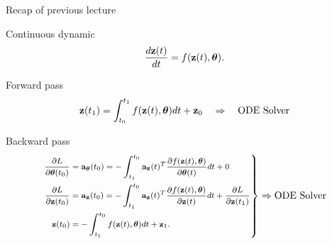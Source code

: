 

\usepackage{tikz}

\usetikzlibrary{arrows,shapes,positioning,shadows,trees}

\begin{frame}
\titlepage
\end{frame}
\begin{frame}{Recap of previous lecture}
	\begin{block}{Continuous dynamic}
		\vspace{-0.5cm}
		\[
			\frac{d\mathbf{z}(t)}{dt} = f(\mathbf{z}(t), \boldsymbol{\theta}).
		\]
		\vspace{-0.5cm}
	\end{block}
	\begin{block}{Forward pass}
		\vspace{-0.5cm}
		\[
			\mathbf{z}(t_1) = \int^{t_1}_{t_0} f(\mathbf{z}(t), \boldsymbol{\theta}) d t  + \mathbf{z}_0 \quad \Rightarrow \quad \text{ODE Solver}
		\]
		\vspace{-0.6cm}
	\end{block}
	\begin{block}{Backward pass}
		\vspace{-0.6cm}
		\begin{equation*}
			\left.
				{\footnotesize 
				\begin{aligned}
					\frac{\partial L}{\partial \boldsymbol{\theta}(t_0)} &= \mathbf{a}_{\boldsymbol{\theta}}(t_0) =  - \int_{t_1}^{t_0} \mathbf{a}_{\mathbf{z}}(t)^T \frac{\partial f(\mathbf{z}(t), \boldsymbol{\theta})}{\partial \boldsymbol{\theta}(t)} dt + 0 \\
					\frac{\partial L}{\partial \mathbf{z}(t_0)} &= \mathbf{a}_{\mathbf{z}}(t_0) =  - \int_{t_1}^{t_0} \mathbf{a}_{\mathbf{z}}(t)^T \frac{\partial f(\mathbf{z}(t), \boldsymbol{\theta})}{\partial \mathbf{z}(t)} dt + \frac{\partial L}{\partial \mathbf{z}(t_1)} \\
					\mathbf{z}(t_0) &= - \int^{t_0}_{t_1} f(\mathbf{z}(t), \boldsymbol{\theta}) d t  + \mathbf{z}_1.
				\end{aligned}
				}
			\right\rbrace
			 \Rightarrow
			\text{ODE Solver}
		\end{equation*}
		\vspace{-0.4cm} 
	\end{block}
\end{frame}
